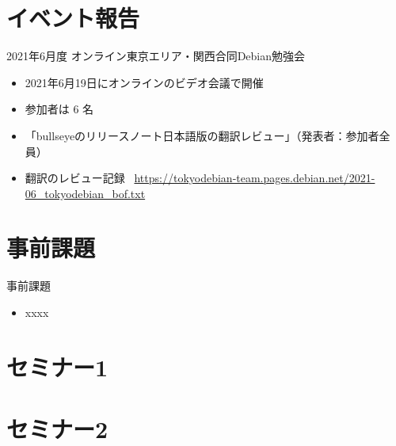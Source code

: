\section{イベント報告}

\begin{frame}{2021年6月度 オンライン東京エリア・関西合同Debian勉強会}
\begin{itemize}
\item 2021年6月19日にオンラインのビデオ会議で開催
\item 参加者は 6 名
\item 「bullseyeのリリースノート日本語版の翻訳レビュー」（発表者：参加者全員）
\item 翻訳のレビュー記録 \
  \url{https://tokyodebian-team.pages.debian.net/2021-06_tokyodebian_bof.txt}
\end{itemize}
\end{frame}


\section{事前課題}


\begin{frame}{事前課題}
  \begin{itemize}
   \item xxxx
  \end{itemize}
\end{frame}

{\footnotesize
  
}

%

\section{セミナー1}

\section{セミナー2}



